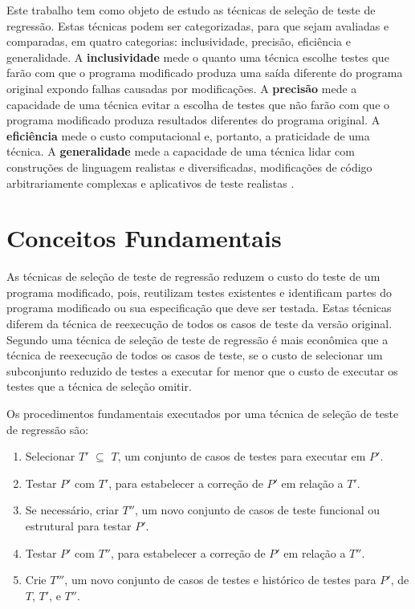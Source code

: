 Este trabalho tem como objeto de estudo as técnicas de seleção de teste de regressão. Estas técnicas podem ser categorizadas, para que sejam avaliadas e comparadas, em quatro categorias: inclusividade, precisão, eficiência e generalidade. A \textbf{inclusividade} mede o quanto uma técnica escolhe testes que farão com que o programa modificado produza uma saída diferente do programa original expondo falhas causadas por modificações. A \textbf{precisão} mede a capacidade de uma técnica evitar a escolha de testes que não farão com que o programa modificado produza resultados diferentes do programa original. A \textbf{eficiência} mede o custo computacional e, portanto, a praticidade de uma técnica. A \textbf{generalidade} mede a capacidade de uma técnica lidar com construções de linguagem realistas e diversificadas, modificações de código arbitrariamente complexas e aplicativos de teste realistas \cite{536955}.

\section{Conceitos Fundamentais}

As técnicas de seleção de teste de regressão reduzem o custo do teste de um programa modificado, pois, reutilizam testes existentes e identificam partes do programa modificado ou sua especificação que deve ser testada. Estas técnicas diferem da técnica de reexecução de todos os casos de teste da versão original. Segundo  uma técnica de seleção de teste de regressão é mais econômica que a técnica de reexecução de todos os casos de teste, se o custo de selecionar um subconjunto reduzido de testes a executar for menor que o custo de executar os testes que a técnica de seleção omitir.

Os procedimentos fundamentais executados por uma técnica de seleção de teste de regressão são: \cite{536955}

\begin{enumerate}
    \item Selecionar $T'$ $\subseteq$ $T$, um conjunto de casos de testes para executar em $P'$.
    \item Testar $P'$ com $T'$, para estabelecer a correção de $P'$ em relação a $T'$.
    \item Se necessário, criar $T''$, um novo conjunto de casos de teste funcional ou estrutural para testar $P'$.
    \item Testar $P'$ com $T''$, para estabelecer a correção de $P'$ em relação a $T''$.
    \item Crie $T'''$, um novo conjunto de casos de testes e histórico de testes para $P'$, de $T$, $T'$, e $T''$.
\end{enumerate}

